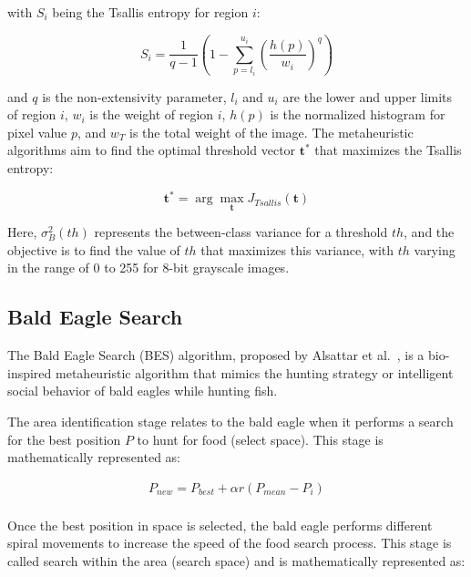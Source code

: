 \documentclass{elsarticle}
\begin{document}
\noindent 
with $S_i$ being the Tsallis entropy for region $i$:

\begin{equation}
S_i = \frac{1}{q-1}\left(1 - \sum_{p=l_i}^{u_i} \left(\frac{h(p)}{w_i}\right)^q\right)
\end{equation}

\noindent 
and $q$ is the non-extensivity parameter, $l_i$ and $u_i$ are the lower and upper limits of region $i$, $w_i$ is the weight of region $i$, $h(p)$ is the normalized histogram for pixel value $p$, and $w_T$ is the total weight of the image.
The metaheuristic algorithms aim to find the optimal threshold vector $\mathbf{t}^*$ that maximizes the Tsallis entropy:

\begin{equation}
\mathbf{t}^* = \arg\max_{\mathbf{t}} J_{Tsallis}(\mathbf{t})
\end{equation}

Here, $\sigma_B^2(th)$ represents the between-class variance for a threshold $th$, and the objective is to find the value of $th$ that maximizes this variance, with $th$ varying in the range of 0 to 255 for 8-bit grayscale images.

\subsection{Bald Eagle Search}

The Bald Eagle Search (BES) algorithm, proposed by Alsattar et al.~\cite{Alsattar2019}, is a bio-inspired metaheuristic algorithm that mimics the hunting strategy or intelligent social behavior of bald eagles while hunting fish.

The area identification stage relates to the bald eagle when it performs a search for the best position $P$ to hunt for food (select space). This stage is mathematically represented as:

\begin{equation}
\begin{gathered}
P_{new}=P_{best}+{\alpha}r(P_{mean}-P_{i})\\
\end{gathered}
\label{eq11}
\end{equation}

Once the best position in space is selected, the bald eagle performs different spiral movements to increase the speed of the food search process. This stage is called search within the area (search space) and is mathematically represented as:
\end{document}
